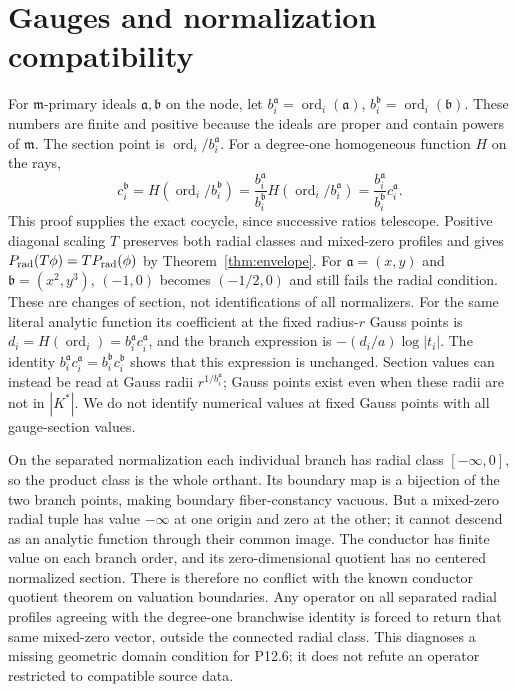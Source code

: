 \documentclass[11pt]{article}
\theoremstyle{definition}
\newcommand{\Prad}{P_{\rm rad}}
\newcommand{\ord}{\operatorname{ord}}
\begin{document}
\section{Gauges and normalization compatibility}
For $\mathfrak m$-primary ideals $\mathfrak a,\mathfrak b$ on the node, let
$b_i^{\mathfrak a}=\ord_i(\mathfrak a)$,
$b_i^{\mathfrak b}=\ord_i(\mathfrak b)$. These numbers are finite and
positive because the ideals are proper and contain powers of
$\mathfrak m$. The section point is $\ord_i/b_i^{\mathfrak a}$.
For a degree-one homogeneous function $H$ on the rays,
\[
 c_i^{\mathfrak b}=H(\ord_i/b_i^{\mathfrak b})
 =\frac{b_i^{\mathfrak a}}{b_i^{\mathfrak b}}
    H(\ord_i/b_i^{\mathfrak a})
 =\frac{b_i^{\mathfrak a}}{b_i^{\mathfrak b}}c_i^{\mathfrak a}.
\]
This proof supplies the exact cocycle, since successive ratios telescope.
Positive diagonal scaling $T$ preserves both radial classes and
mixed-zero profiles and gives
$\Prad(T\phi)=T\Prad(\phi)$ by Theorem~\ref{thm:envelope}.
For $\mathfrak a=(x,y)$ and $\mathfrak b=(x^2,y^3)$,
$(-1,0)$ becomes $(-1/2,0)$ and still fails the radial condition.
These are changes of section, not identifications of all normalizers.
For the same literal analytic function its coefficient at the fixed
radius-$r$ Gauss points is
$d_i=H(\ord_i)=b_i^{\mathfrak a}c_i^{\mathfrak a}$, and the branch
expression is $-(d_i/a)\log|t_i|$. The identity
$b_i^{\mathfrak a}c_i^{\mathfrak a}=b_i^{\mathfrak b}c_i^{\mathfrak b}$
shows that this expression is unchanged. Section values can instead be
read at Gauss radii $r^{1/b_i^{\mathfrak a}}$; Gauss points exist even
when these radii are not in $|K^*|$. We do not identify numerical values
at fixed Gauss points with all gauge-section values.

On the separated normalization each individual branch has radial class
$[-\infty,0]$, so the product class is the whole orthant. Its boundary
map is a bijection of the two branch points, making boundary
fiber-constancy vacuous. But a mixed-zero radial tuple has value
$-\infty$ at one origin and zero at the other; it cannot descend as
an analytic function through their common image. The conductor has
finite value on each branch order, and its zero-dimensional quotient
has no centered normalized section. There is therefore no conflict
with the known conductor quotient theorem on valuation boundaries.
Any operator on all separated radial profiles agreeing with the
degree-one branchwise identity is forced to return that same mixed-zero
vector, outside the connected radial class. This diagnoses a missing
geometric domain condition for P12.6; it does not refute an operator
restricted to compatible source data.
\end{document}
